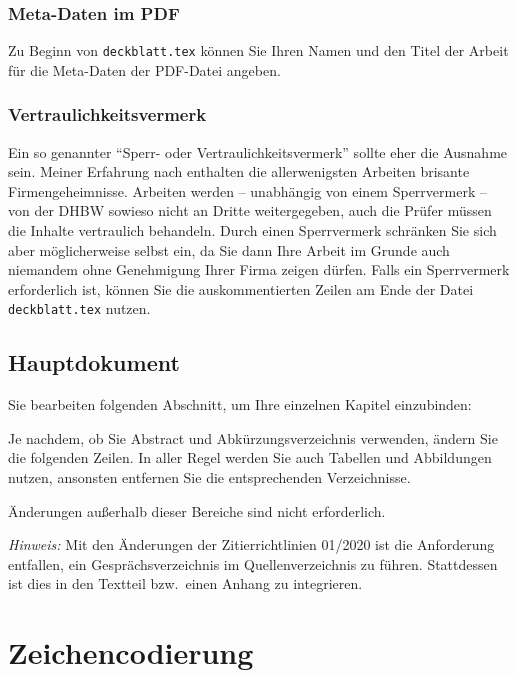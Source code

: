 \subsubsection{Meta-Daten im PDF}
Zu Beginn von \verb|deckblatt.tex| können Sie Ihren Namen und den Titel der Arbeit für die Meta-Daten der PDF-Datei angeben. 


\subsubsection{Vertraulichkeitsvermerk}
Ein so genannter \enquote{Sperr- oder Vertraulichkeitsvermerk} sollte eher die Ausnahme sein. Meiner Erfahrung nach enthalten die allerwenigsten Arbeiten brisante Firmengeheimnisse. Arbeiten werden -- unabhängig von einem Sperrvermerk -- von der DHBW sowieso nicht an Dritte weitergegeben, auch die Prüfer müssen die Inhalte vertraulich behandeln. Durch einen Sperrvermerk schränken Sie sich aber möglicherweise selbst ein, da Sie dann Ihre Arbeit im Grunde auch niemandem ohne Genehmigung Ihrer Firma zeigen dürfen.
Falls ein Sperrvermerk erforderlich ist, können Sie die auskommentierten Zeilen am Ende der Datei \verb|deckblatt.tex| nutzen.

\subsection{Hauptdokument}

Sie bearbeiten folgenden Abschnitt, um Ihre einzelnen Kapitel einzubinden:
\lstset{language=}


Je nachdem, ob Sie Abstract und Abkürzungsverzeichnis verwenden, ändern Sie die folgenden Zeilen.
In aller Regel werden Sie auch Tabellen und Abbildungen nutzen, ansonsten entfernen Sie die entsprechenden Verzeichnisse. 


Änderungen außerhalb dieser Bereiche sind nicht erforderlich.

\emph{Hinweis:} Mit den Änderungen der Zitierrichtlinien 01/2020 ist die Anforderung entfallen, ein Gesprächsverzeichnis im Quellenverzeichnis zu führen. Stattdessen ist dies in den Textteil bzw.\ einen Anhang zu integrieren.


\section{Zeichencodierung}\label{section:zeichencodierung}

